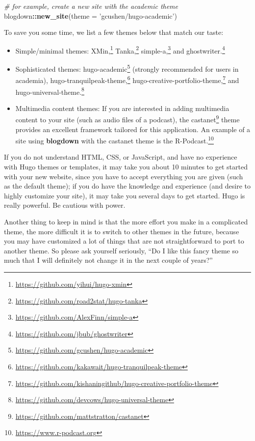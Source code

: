 \documentclass[12pt,]{krantz}
\makeatletter
\newenvironment{Shaded}{\begin{snugshade}}{\end{snugshade}}
\newcommand{\CommentTok}[1]{\textcolor[rgb]{0.56,0.35,0.01}{\textit{#1}}}
\newcommand{\DataTypeTok}[1]{\textcolor[rgb]{0.13,0.29,0.53}{#1}}
\newcommand{\KeywordTok}[1]{\textcolor[rgb]{0.13,0.29,0.53}{\textbf{#1}}}
\newcommand{\NormalTok}[1]{#1}
\newcommand{\OperatorTok}[1]{\textcolor[rgb]{0.81,0.36,0.00}{\textbf{#1}}}
\newcommand{\StringTok}[1]{\textcolor[rgb]{0.31,0.60,0.02}{#1}}
\renewcommand{\href}[2]{#2\footnote{\url{#1}}}
\newenvironment{kframe}{%
\medskip{}
\setlength{\fboxsep}{.8em}
 \def\at@end@of@kframe{}%
 \ifinner\ifhmode%
  \def\at@end@of@kframe{\end{minipage}}%
  \begin{minipage}{\columnwidth}%
 \fi\fi%
 \def\FrameCommand##1{\hskip\@totalleftmargin \hskip-\fboxsep
 \colorbox{shadecolor}{##1}\hskip-\fboxsep
     \hskip-\linewidth \hskip-\@totalleftmargin \hskip\columnwidth}%
 \MakeFramed {\advance\hsize-\width
   \@totalleftmargin\z@ \linewidth\hsize
   \@setminipage}}%
 {\par\unskip\endMakeFramed%
 \at@end@of@kframe}
\renewenvironment{Shaded}{\begin{kframe}}{\end{kframe}}
\theoremstyle{definition}
\theoremstyle{definition}
\theoremstyle{definition}
\theoremstyle{remark}
\makeatother
\begin{document}
\begin{Shaded}
\begin{Highlighting}[]
\CommentTok{# for example, create a new site with the academic theme}
\NormalTok{blogdown}\OperatorTok{::}\KeywordTok{new_site}\NormalTok{(}\DataTypeTok{theme =} \StringTok{'gcushen/hugo-academic'}\NormalTok{)}
\end{Highlighting}
\end{Shaded}

To save you some time, we list a few themes below that match our taste:

\begin{itemize}
\item
  Simple/minimal themes:
  \href{https://github.com/yihui/hugo-xmin}{XMin,}
  \href{https://github.com/road2stat/hugo-tanka}{Tanka,}
  \href{https://github.com/AlexFinn/simple-a}{simple-a,} and
  \href{https://github.com/jbub/ghostwriter}{ghostwriter.}
\item
  Sophisticated themes:
  \href{https://github.com/gcushen/hugo-academic}{hugo-academic}
  (strongly recommended for users in academia),
  \href{https://github.com/kakawait/hugo-tranquilpeak-theme}{hugo-tranquilpeak-theme,}
  \href{https://github.com/kishaningithub/hugo-creative-portfolio-theme}{hugo-creative-portfolio-theme,}
  and
  \href{https://github.com/devcows/hugo-universal-theme}{hugo-universal-theme.}
\item
  Multimedia content themes: If you are interested in adding multimedia
  content to your site (such as audio files of a podcast), the
  \href{https://github.com/mattstratton/castanet}{castanet} theme
  provides an excellent framework tailored for this application. An
  example of a site using \textbf{blogdown} with the castanet theme is
  the \href{https://www.r-podcast.org}{R-Podcast.}
\end{itemize}

If you do not understand HTML, CSS, or JavaScript, and have no
experience with Hugo themes or templates, it may take you about 10
minutes to get started with your new website, since you have to accept
everything you are given (such as the default theme); if you do have the
knowledge and experience (and desire to highly customize your site), it
may take you several days to get started. Hugo is really powerful. Be
cautious with power.

Another thing to keep in mind is that the more effort you make in a
complicated theme, the more difficult it is to switch to other themes in
the future, because you may have customized a lot of things that are not
straightforward to port to another theme. So please ask yourself
seriously, ``Do I like this fancy theme so much that I will definitely
not change it in the next couple of years?''
\end{document}
